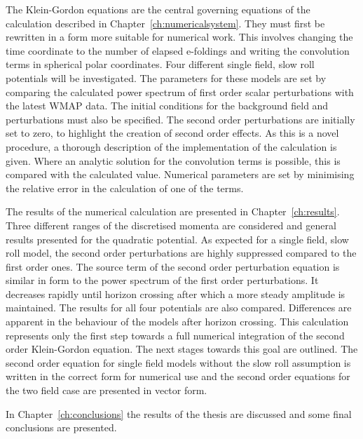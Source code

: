 The Klein-Gordon equations are the central governing equations of the 
calculation described in Chapter~\ref{ch:numericalsystem}. They must first be
rewritten in a form more suitable for numerical work. This involves changing the
time coordinate to the number of elapsed e-foldings and writing the convolution
terms in spherical polar coordinates. Four different single field, slow roll
potentials will be investigated. The parameters for these models are set by
comparing
the calculated power spectrum of first order scalar perturbations with the latest
WMAP data. The initial conditions for the background field and perturbations must
also be specified. The second order perturbations are initially set to zero, to
highlight the creation of second order effects. As this is a novel procedure, a
thorough description of the implementation of the calculation is given. Where
an analytic solution for the convolution terms is possible, this is compared
with the calculated value. Numerical parameters are set by minimising the relative
error in the calculation of one of the terms.


The results of the numerical calculation are presented in Chapter~\ref{ch:results}.
Three different ranges of the discretised momenta are considered and general
results presented for the quadratic potential. 
As expected for a single field, slow
roll model, the second order perturbations are highly suppressed compared to the
first order ones. 
The source term of the second order perturbation equation is similar in form to the
power spectrum of the first order perturbations. It decreases rapidly until
horizon
crossing after which a more steady amplitude is maintained.
% 
% 
The results for all four potentials are also compared. Differences are apparent in
the behaviour of the models after horizon crossing.
This calculation represents only the first step towards a full numerical integration
of the second order Klein-Gordon equation. The next stages towards this goal are
outlined. The second order equation for single field models without the slow roll
assumption is written in the correct form for numerical use and the second order
equations for the two field case are presented in vector form.
% 

In Chapter~\ref{ch:conclusions} the results of the thesis are discussed and some
final conclusions are presented.







